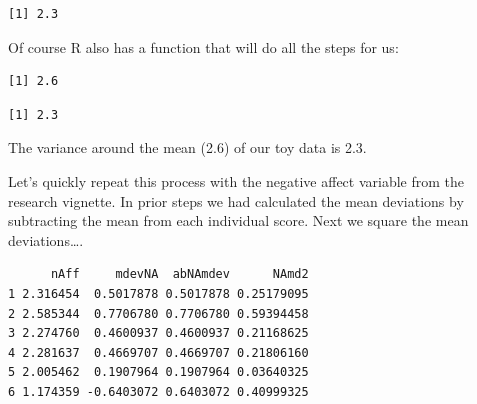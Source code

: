 \documentclass[
  11pt,
]{book}
\newenvironment{Shaded}{\begin{snugshade}}{\end{snugshade}}
\newcommand{\AttributeTok}[1]{\textcolor[rgb]{0.77,0.63,0.00}{#1}}
\newcommand{\ConstantTok}[1]{\textcolor[rgb]{0.00,0.00,0.00}{#1}}
\newcommand{\FunctionTok}[1]{\textcolor[rgb]{0.00,0.00,0.00}{#1}}
\newcommand{\NormalTok}[1]{#1}
\newcommand{\OtherTok}[1]{\textcolor[rgb]{0.56,0.35,0.01}{#1}}
\newcommand{\SpecialCharTok}[1]{\textcolor[rgb]{0.00,0.00,0.00}{#1}}
\begin{document}
\begin{verbatim}
[1] 2.3
\end{verbatim}

Of course R also has a function that will do all the steps for us:

\begin{Shaded}
\end{Shaded}

\begin{verbatim}
[1] 2.6
\end{verbatim}

\begin{Shaded}
\end{Shaded}

\begin{verbatim}
[1] 2.3
\end{verbatim}

The variance around the mean (2.6) of our toy data is 2.3.

Let's quickly repeat this process with the negative affect variable from the research vignette. In prior steps we had calculated the mean deviations by subtracting the mean from each individual score. Next we square the mean deviations\ldots.

\begin{Shaded}
\end{Shaded}

\begin{verbatim}
      nAff     mdevNA  abNAmdev      NAmd2
1 2.316454  0.5017878 0.5017878 0.25179095
2 2.585344  0.7706780 0.7706780 0.59394458
3 2.274760  0.4600937 0.4600937 0.21168625
4 2.281637  0.4669707 0.4669707 0.21806160
5 2.005462  0.1907964 0.1907964 0.03640325
6 1.174359 -0.6403072 0.6403072 0.40999325
\end{verbatim}
\end{document}
